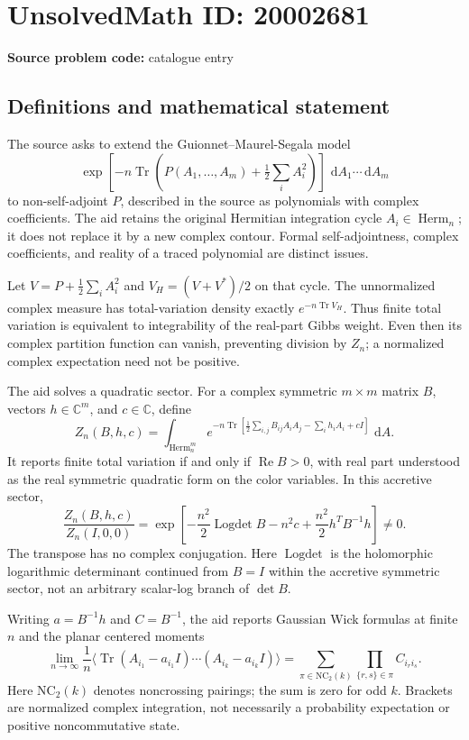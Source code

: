 \documentclass[11pt]{article}
\newcommand{\C}{\mathbb{C}}
\newcommand{\dd}{\,\mathrm{d}}
\begin{document}
\section*{UnsolvedMath ID: 20002681}
\textbf{Source problem code:} catalogue entry
\subsection{Definitions and mathematical statement}
The source asks to extend the Guionnet--Maurel-Segala model
\[
 \exp\!\left[-n\operatorname{Tr}\left(P(A_1,\ldots,A_m)+\tfrac12\sum_iA_i^2\right)\right]
 \,\dd A_1\cdots\dd A_m
\]
to non-self-adjoint $P$, described in the source as polynomials with complex coefficients. The aid retains the original Hermitian integration cycle $A_i\in\operatorname{Herm}_n$; it does not replace it by a new complex contour. Formal self-adjointness, complex coefficients, and reality of a traced polynomial are distinct issues.

Let $V=P+\tfrac12\sum_iA_i^2$ and $V_H=(V+V^*)/2$ on that cycle. The unnormalized complex measure has total-variation density exactly $e^{-n\operatorname{Tr}V_H}$. Thus finite total variation is equivalent to integrability of the real-part Gibbs weight. Even then its complex partition function can vanish, preventing division by $Z_n$; a normalized complex expectation need not be positive.

The aid solves a quadratic sector. For a complex symmetric $m\times m$ matrix $B$, vectors $h\in\C^m$, and $c\in\C$, define
\[
 Z_n(B,h,c)=\int_{\operatorname{Herm}_n^m}
 e^{-n\operatorname{Tr}[\frac12\sum_{i,j}B_{ij}A_iA_j-\sum_ih_iA_i+cI]}
 \,\dd A.
\]
It reports finite total variation if and only if $\operatorname{Re}B>0$, with real part understood as the real symmetric quadratic form on the color variables. In this accretive sector,
\[
 \frac{Z_n(B,h,c)}{Z_n(I,0,0)}=
 \exp\left[-\frac{n^2}{2}\operatorname{Logdet}B-n^2c
 +\frac{n^2}{2}h^TB^{-1}h\right]\ne0.
\]
The transpose has no complex conjugation. Here $\operatorname{Logdet}$ is the holomorphic logarithmic determinant continued from $B=I$ within the accretive symmetric sector, not an arbitrary scalar-log branch of $\det B$.

Writing $a=B^{-1}h$ and $C=B^{-1}$, the aid reports Gaussian Wick formulas at finite $n$ and the planar centered moments
\[
 \lim_{n\to\infty}\frac1n\langle\operatorname{Tr}
 (A_{i_1}-a_{i_1}I)\cdots(A_{i_k}-a_{i_k}I)\rangle
 =\sum_{\pi\in\mathrm{NC}_2(k)}\prod_{\{r,s\}\in\pi}C_{i_ri_s}.
\]
Here $\mathrm{NC}_2(k)$ denotes noncrossing pairings; the sum is zero for odd $k$. Brackets are normalized complex integration, not necessarily a probability expectation or positive noncommutative state.
\end{document}
